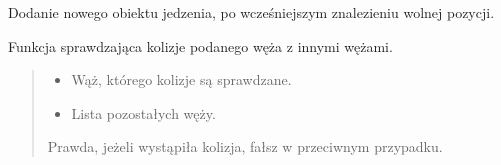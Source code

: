 \documentclass[letterpaper,10pt,polish]{sphinxmanual}
\begin{document}
\begin{fulllineitems}

\begin{fulllineitems}
\label{\detokenize{main:main.Main.add_food}}
\pysigstartsignatures
{}
\pysigstopsignatures
\sphinxAtStartPar
Dodanie nowego obiektu jedzenia, po wcześniejszym znalezieniu
wolnej pozycji.

\end{fulllineitems}


\begin{fulllineitems}
\label{\detokenize{main:main.Main.check_snake_collisions}}
\pysigstartsignatures
{}
\pysigstopsignatures
\sphinxAtStartPar
Funkcja sprawdzająca kolizje podanego węża z innymi wężami.
\begin{quote}\begin{description}
\begin{itemize}
\item {} 
\sphinxAtStartPar
{} \textendash{} Wąż, którego kolizje są sprawdzane.

\item {} 
\sphinxAtStartPar
{} \textendash{} Lista pozostałych węży.

\end{itemize}

\sphinxAtStartPar
Prawda, jeżeli wystąpiła kolizja, fałsz w przeciwnym przypadku.

\end{description}\end{quote}

\end{fulllineitems}


\end{fulllineitems}
\end{document}
